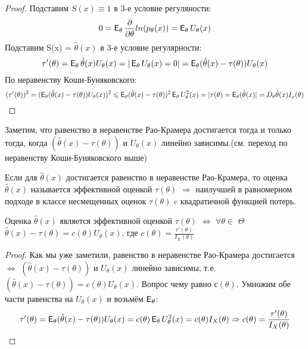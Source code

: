 \begin{proof}
Подставим $S(x) \equiv 1$ в 3-е условие регуляности:
$$
0 = \E_\theta\frac{\partial}{\partial\theta}ln(p_\theta(x)) = \E_\theta U_\theta(x)
$$
Подставим S(x) = $\hat\theta(x)$ в 3-е условие регулярности:
$$
\tau'(\theta) = \E_\theta\hat\theta(x)U_\theta(x) = |\E_\theta U_\theta(x) = 0| = \E_\theta(\hat\theta(x) - \tau(\theta))U_\theta(x)
$$
По неравенству Коши-Буняковского:
$$
(\tau'(\theta))^2 = (\E_\theta(\hat\theta(x) - \tau(\theta))U_\theta(x))^2 \leq \E_\theta(\hat\theta(x) - \tau(\theta))^2 \E_\theta U^2_\theta(x) = |\tau(\theta) = \E_\theta(\hat\theta(x)| = D_\theta\hat\theta(x)I_x(\theta)
$$
\end{proof}
\begin{remark}
Заметим, что равенство в неравенстве Рао-Крамера достигается тогда и только тогда, когда $(\hat\theta(x) - \tau(\theta))$ и $U_\theta(x)$ линейно зависимы.(см. переход по неравенству Коши-Буняковского выше)
\end{remark}

\begin{definition}
Если для $\hat\theta(x)$ достигается равенство в неравенстве Рао-Крамера, то оценка $\hat\theta(x)$ называется эффективной оценкой $\tau(\theta)$ $\Rightarrow$ наилучшей в равномерном подходе в классе несмещенных оценок $\tau(\theta)$ c квадратичной функцией потерь. 
\end{definition}

\begin{consequence}
Оценка $\hat\theta(x)$ является эффективной оценкой $\tau(\theta)$ $\Leftrightarrow$ $\forall \theta \in$ $\Theta$ $\hat\theta(x) - \tau(\theta) = c(\theta)U_\theta(x)$, где $c(\theta) = \frac{\tau'(\theta)}{I_X(\theta)}$
\end{consequence}

\begin{proof}
Как мы уже заметили, равенство в неравенстве Рао-Крамера достигается $\Leftrightarrow$ $(\hat\theta(x) - \tau(\theta))$ и $U_\theta(x)$ линейно зависимы, т.е. $(\hat\theta(x) - \tau(\theta)) = c(\theta)U_\theta(x)$. Вопрос чему равно с$(\theta)$. Умножим обе части равенства на $U_\theta(x)$ и возьмём $\E_\theta$:
$$
\tau'(\theta) = \E_\theta(\hat\theta(x) - \tau(\theta))U_\theta(x) = c(\theta)\E_\theta U^2_\theta(x) = c(\theta)I_X(\theta) \Rightarrow c(\theta) = \frac{\tau'(\theta)}{I_X(\theta)}
$$
\end{proof}

